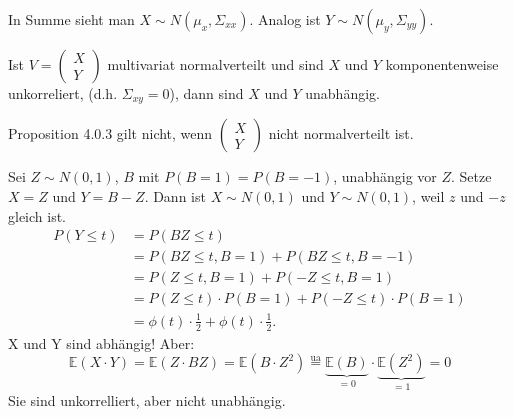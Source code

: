 \documentclass[10pt]{article}
\newcommand{\EW}{\mathbb{E}} %
\newcommand{\halb}{\frac{1}{2}} %
\newenvironment{BSP}[1][]
{\begin{Beispiel}[frametitle=#1]}{\end{Beispiel}}
\begin{document}
			In Summe sieht man $X \sim N(\mu_x, \Sigma_{xx})$. Analog ist $Y \sim N(\mu_y, \Sigma_{yy})$.
			\begin{Proposition}
				Ist $V = \left(
				\begin{array}{c}
					X\\
					Y
				\end{array}
				\right)$ multivariat normalverteilt und sind $X$ und $Y$ komponentenweise unkorreliert, (d.h. $\Sigma_{xy} = 0$), dann sind $X$ und $Y$ unabhängig. 
			\end{Proposition}
			\begin{Bemerkung}
				Proposition 4.0.3 gilt nicht, wenn $\left(
				\begin{array}{c}
					X\\
					Y
				\end{array}
				\right)$ nicht normalverteilt ist. 
			\end{Bemerkung}
			\begin{BSP}[Beispiel 4.0.1 (Unabhängigkeit)]
				Sei $Z \sim N(0,1)$, $B$ mit $P(B=1) = P(B=-1)$, unabhängig vor $Z$. Setze $X=Z$ und $Y=B-Z$. Dann ist $X \sim N(0,1)$ und $Y \sim N(0,1)$, weil $z$ und $-z$ gleich ist.
				\begin{equation*}
					\begin{split}
						P (Y \leq t) &= P(BZ \leq t)\\
						&= P(BZ \leq t, B = 1) + P(BZ \leq t, B = -1)\\
						&= P(Z \leq t, B=1) + P(-Z \leq t, B = 1)\\
						&= P(Z \leq t) \cdot P(B=1) + P(-Z \leq t) \cdot P(B =1)\\
						&= \phi(t) \cdot \halb + \phi(t) \cdot \halb.
					\end{split}
				\end{equation*}
				X und Y sind abhängig!
				Aber: \begin{equation*}
					\EW(X \cdot Y) = \EW (Z\cdot BZ) = \EW(B \cdot Z^2) \overset{\text{ua}}{=} \underbrace{\EW(B)}_{=0} \cdot \underbrace{\EW(Z^2)}_{=1} = 0
				\end{equation*}
				Sie sind unkorrelliert, aber nicht unabhängig. 
			\end{BSP}
\end{document}
